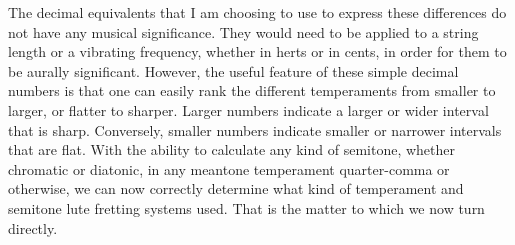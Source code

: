 The decimal equivalents that I am choosing to use to express these differences do not
have any musical significance.  They would need to be applied to a string length or
a vibrating frequency, whether in herts or in cents, in order for them to be aurally
significant.  However, the useful feature of these simple decimal numbers is that one
can easily rank the different temperaments from smaller to larger, or flatter to sharper.
Larger numbers indicate a larger or wider interval that is sharp.  Conversely, smaller
numbers indicate smaller or narrower intervals that are flat.  With the ability to calculate
any kind of semitone, whether chromatic or diatonic, in any meantone temperament quarter-comma
or otherwise, we can now correctly determine what kind of temperament and semitone lute fretting
systems used.  That is the matter to which we now turn directly.